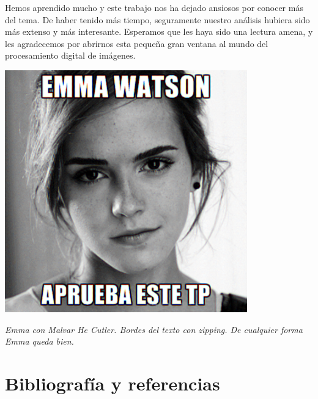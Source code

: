 Hemos aprendido mucho y este trabajo nos ha dejado ansiosos por conocer más del tema. De haber tenido más tiempo, seguramente nuestro análisis hubiera sido más extenso y más interesante. Esperamos que les haya sido una lectura amena, y les agradecemos por abrirnos esta pequeña gran ventana al mundo del procesamiento digital de imágenes.

	\begin{center}
		\includegraphics[scale=0.5]{img/filtered_apruebaestetp.png}
		\vspace{2pt}
		\par
		\footnotesize\textit{Emma con Malvar He Cutler. Bordes del texto con zipping. De cualquier forma Emma queda bien.}
	\end{center}


\section{Bibliografía y referencias} 

